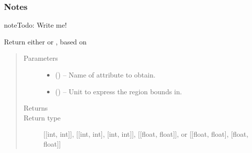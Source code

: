 \documentclass[letterpaper,10pt,english]{sphinxmanual}
\begin{document}
\begin{fulllineitems}
\begin{quote}
\begin{description}
\begin{itemize}
\end{itemize}

\end{description}\end{quote}
\subsubsection*{Notes}

\begin{sphinxadmonition}{note}{\label{\detokenize{references/freqfilter:id1}}Todo:}
\sphinxAtStartPar
Write me!
\end{sphinxadmonition}

\begin{fulllineitems}
\label{\detokenize{references/freqfilter:nmrespy.freqfilter.FrequencyFilter._get_region}}
\sphinxAtStartPar
Return either  or , based on 
\begin{quote}\begin{description}
\item[{Parameters}] \leavevmode\begin{itemize}
\item {} 
\sphinxAtStartPar
{} () – Name of attribute to obtain.

\item {} 
\sphinxAtStartPar
{} (\sphinxstyleliteralemphasis{\sphinxupquote{, }}\sphinxstyleliteralemphasis{\sphinxupquote{, }}) – Unit to express the region bounds in.

\end{itemize}

\item[{Returns}] \leavevmode
\sphinxAtStartPar
{}

\item[{Return type}] \leavevmode
\sphinxAtStartPar
{[}{[}int, int{]}{]}, {[}{[}int, int{]}, {[}int, int{]}{]}, {[}{[}float, float{]}{]},        or {[}{[}float, float{]}, {[}float, float{]}{]}


\end{description}
\end{quote}
\end{fulllineitems}
\end{fulllineitems}
\end{document}
